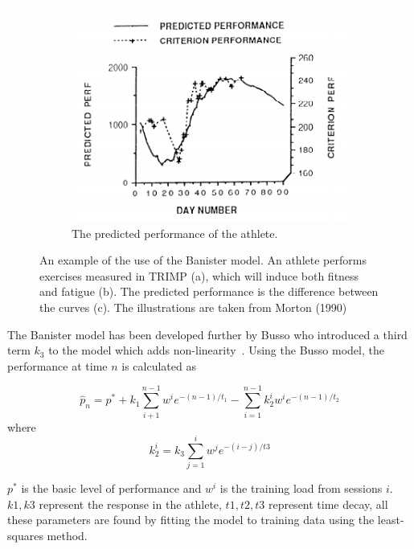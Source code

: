 \begin{figure}[ht]
\begin{subfigure}[t]{0.48\textwidth}
        \includegraphics[width=\textwidth]{chapters/figures/background/banister3.pdf}
        \captionsetup{width=.9\linewidth}
        \caption{The predicted performance of the athlete.}
    \end{subfigure}
    \caption{An example of the use of the Banister model. An athlete performs exercises measured in TRIMP (a), which will induce both fitness and fatigue (b). The predicted performance is the difference between the curves (c). The illustrations are taken from Morton (1990)~\cite{morton1990modeling}}
    \label{fig:banister_example}
\end{figure}


The Banister model has been developed further by Busso who introduced a third term $k_3$ to the model which adds non-linearity~\cite{busso2003variable}. Using the Busso model, the performance at time $n$ is calculated as

\begin{equation}
    \hat{p}_n = p^\ast + k_1 \sum_{i+1}^{n-1} w^i e^{-(n-1)/t_1} - \sum_{i=1}^{n-1} k_2^i w^i e^{-(n-1)/t_2}
    \label{eq:busso_model}
\end{equation}
where
\begin{equation}
        k_2^i = k_3 \sum_{j=1}^i w^j e^{-(i-j)/t3}
\end{equation}

$p^\ast$ is the basic level of performance and $w^i$ is the training load from sessions $i$. $k1,k3$ represent the response in the athlete, $t1,t2,t3$ represent time decay, all these parameters are found by fitting the model to training data using the least-squares method.

